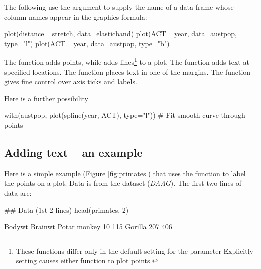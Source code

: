 The following use the argument  to supply the name of a
data frame whose column names appear in the graphics formula:
\begin{Schunk}
\begin{Sinput}
plot(distance ~ stretch, data=elasticband)
plot(ACT ~ year, data=austpop, type="l")
plot(ACT ~ year, data=austpop, type="b")
\end{Sinput}
\end{Schunk}

The  function adds points, while  adds
lines\footnote{These functions differ only in the default
  setting for the parameter   Explicitly setting
 causes either function to plot points.}  to a plot.
The  function adds text at specified locations.  The
 function places text in one of the margins.  The
 function gives fine control over axis ticks and labels.

Here is a further possibility
\begin{Schunk}
\begin{Sinput}
with(austpop, plot(spline(year, ACT), type="l"))
  # Fit smooth curve through points
\end{Sinput}
\end{Schunk}

\subsection*{Adding text -- an example}\label{ss:addpoints}
Here is a simple example (Figure \ref{fig:primates}) that uses the
function  to label the points on a plot. Data is from
the dataset  ({\em DAAG}).  The first two lines of
data are:
\begin{Schunk}
\begin{Sinput}
## Data (1st 2 lines)
head(primates, 2)
\end{Sinput}
\begin{Soutput}
             Bodywt Brainwt
Potar monkey     10     115
Gorilla         207     406
\end{Soutput}
\end{Schunk}

